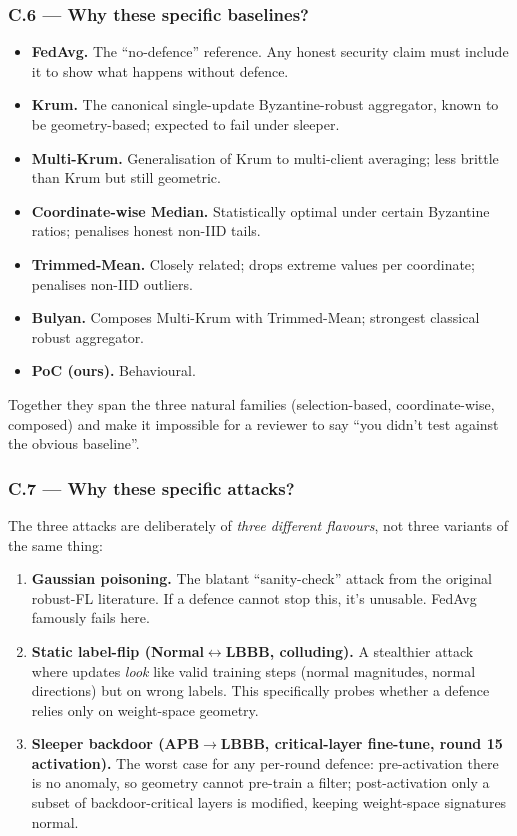 \documentclass[11pt,a4paper]{article}
\begin{document}
\subsubsection{C.6 --- Why these specific baselines?}

\begin{itemize}
\item \textbf{FedAvg.} The ``no-defence'' reference. Any honest security claim must include it to show what happens without defence.
\item \textbf{Krum.} The canonical single-update Byzantine-robust aggregator, known to be geometry-based; expected to fail under sleeper.
\item \textbf{Multi-Krum.} Generalisation of Krum to multi-client averaging; less brittle than Krum but still geometric.
\item \textbf{Coordinate-wise Median.} Statistically optimal under certain Byzantine ratios; penalises honest non-IID tails.
\item \textbf{Trimmed-Mean.} Closely related; drops extreme values per coordinate; penalises non-IID outliers.
\item \textbf{Bulyan.} Composes Multi-Krum with Trimmed-Mean; strongest classical robust aggregator.
\item \textbf{PoC (ours).} Behavioural.
\end{itemize}

Together they span the three natural families (selection-based,
coordinate-wise, composed) and make it impossible for a reviewer to
say ``you didn't test against the obvious baseline''.

\subsubsection{C.7 --- Why these specific attacks?}

The three attacks are deliberately of \emph{three different flavours},
not three variants of the same thing:
\begin{enumerate}
\item \textbf{Gaussian poisoning.} The blatant ``sanity-check'' attack from the original robust-FL literature. If a defence cannot stop this, it's unusable. FedAvg famously fails here.
\item \textbf{Static label-flip (Normal$\leftrightarrow$LBBB, colluding).} A stealthier attack where updates \emph{look} like valid training steps (normal magnitudes, normal directions) but on wrong labels. This specifically probes whether a defence relies only on weight-space geometry.
\item \textbf{Sleeper backdoor (APB$\rightarrow$LBBB, critical-layer fine-tune, round 15 activation).} The worst case for any per-round defence: pre-activation there is no anomaly, so geometry cannot pre-train a filter; post-activation only a subset of backdoor-critical layers is modified, keeping weight-space signatures normal.
\end{enumerate}
\end{document}
